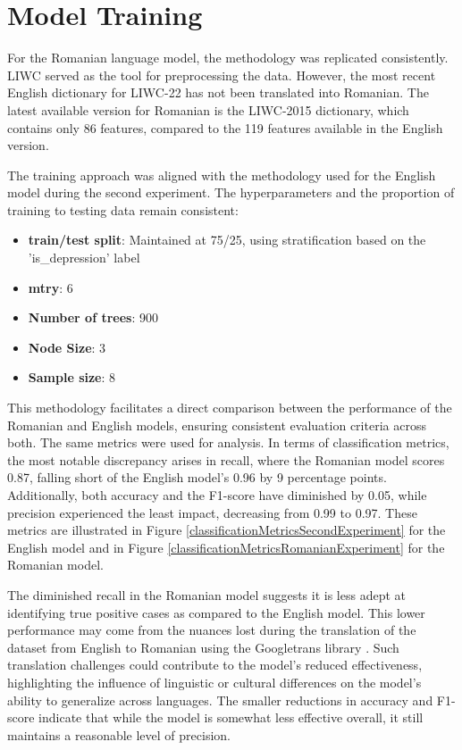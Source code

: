 \section{Model Training}

\quad For the Romanian language model, the methodology was replicated consistently. LIWC served as the tool for preprocessing the data. However, the most recent English dictionary for LIWC-22 has not been translated into Romanian. The latest available version for Romanian is the LIWC-2015 dictionary, which contains only 86 features, compared to the 119 features available in the English version.

The training approach was aligned with the methodology used for the English model during the second experiment. The hyperparameters and the proportion of training to testing data remain consistent:

\begin{itemize}
\item \textbf{train/test split}: Maintained at 75/25, using stratification based on the 'is\_depression' label
\item \textbf{mtry}: 6
\item \textbf{Number of trees}: 900
\item \textbf{Node Size}: 3
\item \textbf{Sample size}: 8
\end{itemize}

This methodology facilitates a direct comparison between the performance of the Romanian and English models, ensuring consistent evaluation criteria across both. The same metrics were used for analysis. In terms of classification metrics, the most notable discrepancy arises in recall, where the Romanian model scores 0.87, falling short of the English model's 0.96 by 9 percentage points. Additionally, both accuracy and the F1-score have diminished by 0.05, while precision experienced the least impact, decreasing from 0.99 to 0.97. These metrics are illustrated in Figure \ref{classificationMetricsSecondExperiment} for the English model and in Figure \ref{classificationMetricsRomanianExperiment} for the Romanian model.

The diminished recall in the Romanian model suggests it is less adept at identifying true positive cases as compared to the English model. This lower performance may come from the nuances lost during the translation of the dataset from English to Romanian using the Googletrans library \cite{googletranslib}. Such translation challenges could contribute to the model’s reduced effectiveness, highlighting the influence of linguistic or cultural differences on the model’s ability to generalize across languages. The smaller reductions in accuracy and F1-score indicate that while the model is somewhat less effective overall, it still maintains a reasonable level of precision.

